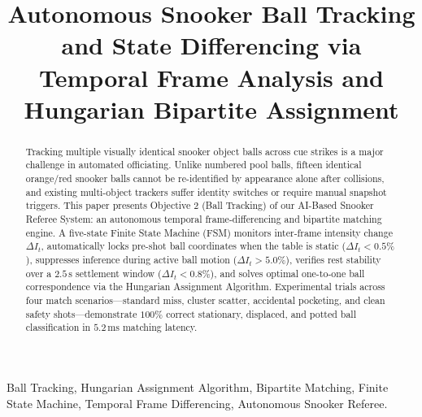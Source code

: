 \documentclass[conference]{IEEEtran}
\begin{document}
\title{Autonomous Snooker Ball Tracking and State Differencing via Temporal Frame Analysis and Hungarian Bipartite Assignment}

\author{
}

\maketitle

\begin{abstract}
Tracking multiple visually identical snooker object balls across cue strikes is a major challenge in automated officiating. Unlike numbered pool balls, fifteen identical orange/red snooker balls cannot be re-identified by appearance alone after collisions, and existing multi-object trackers suffer identity switches or require manual snapshot triggers. This paper presents Objective 2 (Ball Tracking) of our AI-Based Snooker Referee System: an autonomous temporal frame-differencing and bipartite matching engine. A five-state Finite State Machine (FSM) monitors inter-frame intensity change $\Delta I_t$, automatically locks pre-shot ball coordinates when the table is static ($\Delta I_t < 0.5\%$), suppresses inference during active ball motion ($\Delta I_t > 5.0\%$), verifies rest stability over a $2.5\,\text{s}$ settlement window ($\Delta I_t < 0.8\%$), and solves optimal one-to-one ball correspondence via the Hungarian Assignment Algorithm. Experimental trials across four match scenarios---standard miss, cluster scatter, accidental pocketing, and clean safety shots---demonstrate $100\%$ correct stationary, displaced, and potted ball classification in $5.2\,\text{ms}$ matching latency.
\end{abstract}

\begin{IEEEkeywords}
Ball Tracking, Hungarian Assignment Algorithm, Bipartite Matching, Finite State Machine, Temporal Frame Differencing, Autonomous Snooker Referee.
\end{IEEEkeywords}
\end{document}
